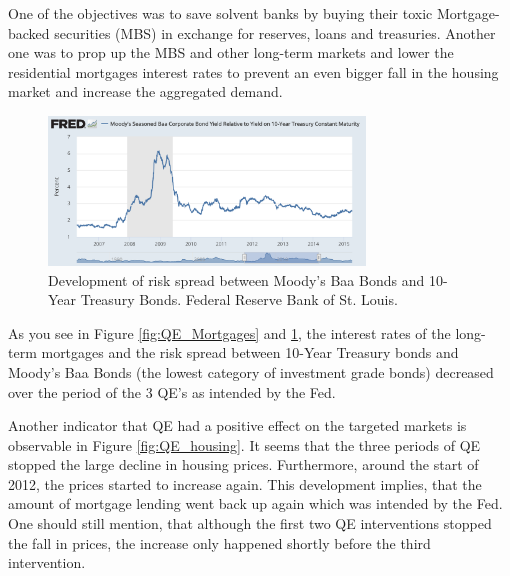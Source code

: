 \documentclass[11pt,a4paper,oneside]{book}
\begin{document}
One of the objectives was to save solvent banks by buying their toxic Mortgage-backed securities (MBS) in exchange for reserves, loans and treasuries. Another one was to prop up the MBS and other long-term markets and lower the residential mortgages interest rates to prevent an even bigger fall in the housing market and increase the aggregated demand.

\begin{figure}[h!]
  \centering
    \includegraphics[width=0.75\textwidth]{QE_Baa.png}
    \caption{Development of risk spread between Moody's Baa Bonds and 10-Year Treasury Bonds. Federal Reserve Bank of St. Louis.}
    \label{fig:QE_Baa}
\end{figure}

As you see in Figure \ref{fig:QE_Mortgages} and \ref{fig:QE_Baa}, the interest rates of the long-term mortgages and the risk spread between 10-Year Treasury bonds and Moody's Baa Bonds (the lowest category of investment grade bonds) decreased over the period of the 3 QE's as intended by the Fed.

Another indicator that QE had a positive effect on the targeted markets is observable in Figure \ref{fig:QE_housing}. It seems that the three periods of QE stopped the large decline in housing prices. Furthermore, around the start of 2012, the prices started to increase again. This development implies, that the amount of mortgage lending went back up again which was intended by the Fed. One should still mention, that although the first two QE interventions stopped the fall in prices, the increase only happened shortly before the third intervention.
\end{document}
